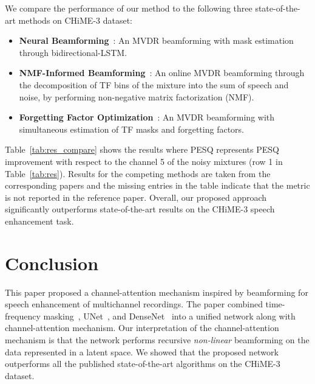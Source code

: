 \documentclass{article}
\begin{document}
We compare the performance of our method to the following three state-of-the-art methods on CHiME-3 dataset:

\begin{itemize}
\item \textbf{Neural Beamforming}~\cite{erdogan}: An MVDR beamforming with mask estimation through bidirectional-LSTM.
\item \textbf{NMF-Informed Beamforming}~\cite{nmfb}: An online MVDR beamforming through the decomposition of TF bins of the mixture into the sum of speech and noise, by performing non-negative matrix factorization (NMF).
\item \textbf{Forgetting Factor Optimization}~\cite{forget}: An MVDR beamforming with simultaneous estimation of TF masks and forgetting factors.
\end{itemize}



Table~\ref{tab:res_compare} shows the results where PESQ represents PESQ improvement with respect to the channel 5 of the noisy mixtures (row 1 in Table~\ref{tab:res}). Results for the competing methods are taken from the corresponding papers and the missing entries in the table indicate that the metric is not reported in the reference paper. Overall, our proposed approach significantly outperforms state-of-the-art results on the CHiME-3 speech enhancement task.

\vspace{-2mm}
\section{Conclusion}
\label{sec:con}

This paper proposed a channel-attention mechanism inspired by beamforming for speech enhancement of multichannel recordings. The paper combined time-frequency masking~\cite{TFmask}, UNet~\cite{unet}, and DenseNet~\cite{denseNet} into a unified network along with channel-attention mechanism. Our interpretation of the channel-attention mechanism is that the network performs recursive \emph{non-linear} beamforming on the data represented in a latent space. We showed that the proposed network outperforms all the published state-of-the-art algorithms on the CHiME-3 dataset. 




\balance


\end{document}
